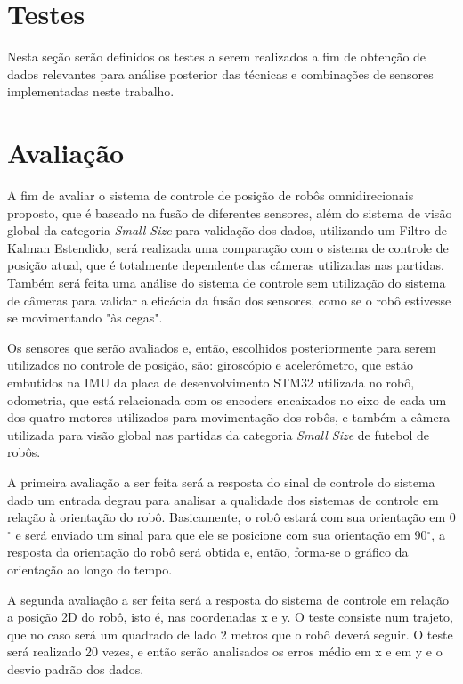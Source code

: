 \documentclass[acronym, symbols]{fei}
\begin{document}
	\section{Testes}
	
		Nesta seção serão definidos os testes a serem realizados a fim de obtenção de dados relevantes para análise posterior das técnicas e combinações de sensores implementadas neste trabalho.
	
	\section{Avaliação}

		A fim de avaliar o sistema de controle de posição de robôs omnidirecionais proposto, que é baseado na fusão de diferentes sensores, além do sistema de visão global da categoria \textit{Small Size} para validação dos dados, utilizando um Filtro de Kalman Estendido, será realizada uma comparação com o sistema de controle de posição atual, que é totalmente dependente das câmeras utilizadas nas partidas. Também será feita uma análise do sistema de controle sem utilização do sistema de câmeras para validar a eficácia da fusão dos sensores, como se o robô estivesse se movimentando "às cegas".
		
		Os sensores que serão avaliados e, então, escolhidos posteriormente para serem utilizados no controle de posição, são: giroscópio e acelerômetro, que estão embutidos na IMU da placa de desenvolvimento STM32 utilizada no robô, odometria, que está relacionada com os encoders encaixados no eixo de cada um dos quatro motores utilizados para movimentação dos robôs, e também a câmera utilizada para visão global nas partidas da categoria \textit{Small Size} de futebol de robôs.
		
		A primeira avaliação a ser feita será a resposta do sinal de controle do sistema dado um entrada degrau para analisar a qualidade dos sistemas de controle em relação à orientação do robô. Basicamente, o robô estará com sua orientação em 0$^\circ$ e será enviado um sinal para que ele se posicione com sua orientação em 90$^\circ$, a resposta da orientação do robô será obtida e, então, forma-se o gráfico da orientação ao longo do tempo.
		
		A segunda avaliação a ser feita será a resposta do sistema de controle em relação a posição 2D do robô, isto é, nas coordenadas x e y. O teste consiste num trajeto, que no caso será um quadrado de lado 2 metros que o robô deverá seguir. O teste será realizado 20 vezes, e então serão analisados os erros médio em x e em y e o desvio padrão dos dados.
		
\end{document}
